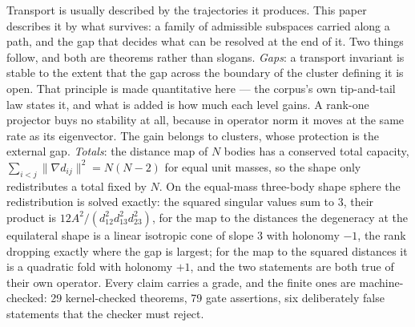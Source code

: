 Transport is usually described by the trajectories it produces. This paper describes it by what
survives: a family of admissible subspaces carried along a path, and the gap that decides what can
be resolved at the end of it. Two things follow, and both are theorems rather than slogans.
\emph{Gaps}: a transport invariant is stable to the extent that the gap across the
boundary of the cluster defining it is open. That principle is made quantitative here --- the corpus's own tip-and-tail
law states it, and what is added is how much each level gains. A rank-one projector buys no
stability at all, because in operator norm it moves at the same rate as its eigenvector.
The gain belongs to clusters, whose protection is the external gap. \emph{Totals}: the distance
map of $N$ bodies has a conserved total capacity, $\sum_{i<j}\lVert\nabla d_{ij}\rVert^2=N(N-2)$
for equal unit masses, so the shape only redistributes a total fixed by $N$. On the equal-mass three-body
shape sphere the redistribution is solved exactly: the squared singular values sum to $3$, their
product is $12A^2/(d_{12}^2d_{13}^2d_{23}^2)$, for the map to the distances the degeneracy at the equilateral shape is a linear
isotropic cone of slope $3$ with holonomy $-1$, the rank dropping exactly where the gap is
largest; for the map to the squared distances it is a quadratic fold with holonomy $+1$, and the
two statements are both true of their own operator. Every claim carries a grade, and the finite ones are machine-checked: 29 kernel-checked theorems, 79 gate
assertions, six deliberately false statements that the checker must reject.
